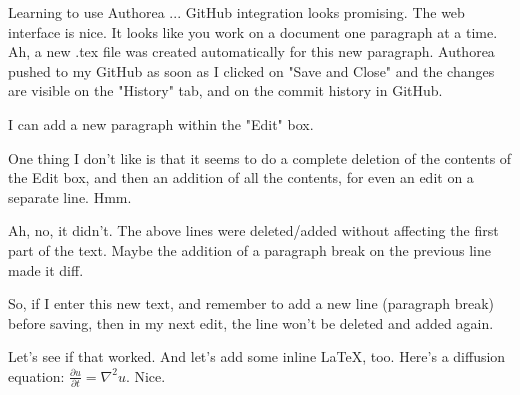 Learning to use Authorea ... GitHub integration looks promising. The web interface is nice. It looks like you work on a document one paragraph at a time. Ah, a new .tex file was created automatically for this new paragraph. Authorea pushed to my GitHub as soon as I clicked on "Save and Close" and the changes are visible on the "History" tab, and on the commit history in GitHub.

I can add a new paragraph within the "Edit" box.

One thing I don't like is that it seems to do a complete deletion of the contents of the Edit box, and then an addition of all the contents, for even an edit on a separate line. Hmm.

Ah, no, it didn't. The above lines were deleted/added without affecting the first part of the text. Maybe the addition of a paragraph break on the previous line made it diff.

So, if I enter this new text, and remember to add a new line (paragraph break) before saving, then in my next edit, the line won't be deleted and added again.

Let's see if that worked. And let's add some inline LaTeX, too. Here's a diffusion equation: $\frac{\partial u}{\partial t}=\nabla^2 u$. Nice.
